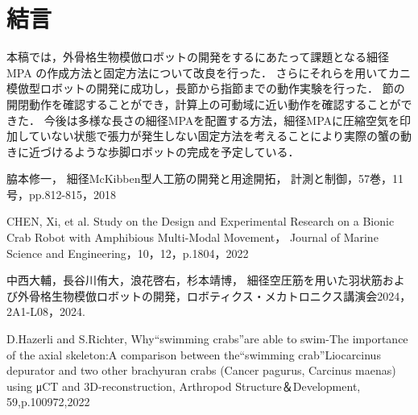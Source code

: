 \documentclass{jarticle}
\begin{document}
\section{結言}
本稿では，外骨格生物模倣ロボットの開発をするにあたって課題となる細径MPA の作成方法と固定方法について改良を行った．
さらにそれらを用いてカニ模倣型ロボットの開発に成功し，長節から指節までの動作実験を行った．
節の開閉動作を確認することができ，計算上の可動域に近い動作を確認することができた．
今後は多様な長さの細径MPAを配置する方法，細径MPAに圧縮空気を印加していない状態で張力が発生しない固定方法を考えることにより実際の蟹の動きに近づけるような歩脚ロボットの完成を予定している．
\begin{thebibliography}{99}
  脇本修一，
  細径McKibben型人工筋の開発と用途開拓，
  計測と制御，57巻，11号，pp.812-815，2018
  
  CHEN, Xi, et al. Study on the Design and Experimental Research on a Bionic Crab Robot with Amphibious Multi-Modal Movement， Journal of Marine Science and Engineering，10，12，p.1804，2022
  
  中西大輔，長谷川侑大，浪花啓右，杉本靖博，
  細径空圧筋を用いた羽状筋および外骨格生物模倣ロボットの開発，ロボティクス・メカトロニクス講演会2024，2A1-L08，2024.

  D.Hazerli and S.Richter,
  Why“swimming crabs”are able to swim-The importance of the axial skeleton:A comparison between the“swimming crab”Liocarcinus depurator and two other brachyuran crabs (Cancer pagurus, Carcinus maenas) using μCT and 3D-reconstruction,
  Arthropod Structure＆Development,
  59,p.100972,2022

 \end{thebibliography}
\end{document}
